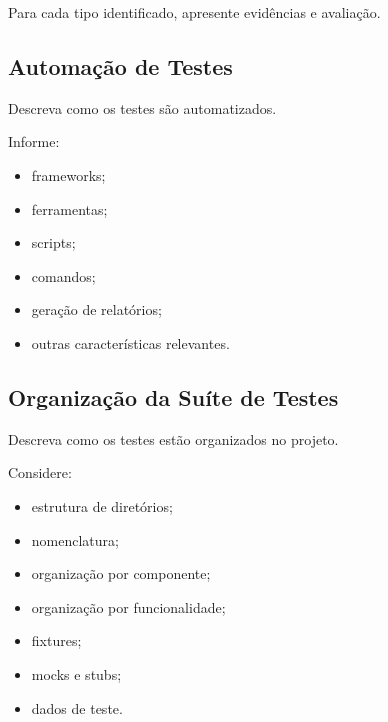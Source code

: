 Para cada tipo identificado, apresente evidências e avaliação.



\subsection{Automação de Testes}

Descreva como os testes são automatizados.

Informe:

\begin{itemize}
    \item frameworks;
    \item ferramentas;
    \item scripts;
    \item comandos;
    \item geração de relatórios;
    \item outras características relevantes.
\end{itemize}



\subsection{Organização da Suíte de Testes}

Descreva como os testes estão organizados no projeto.

Considere:

\begin{itemize}
    \item estrutura de diretórios;
    \item nomenclatura;
    \item organização por componente;
    \item organização por funcionalidade;
    \item fixtures;
    \item mocks e stubs;
    \item dados de teste.
\end{itemize}



